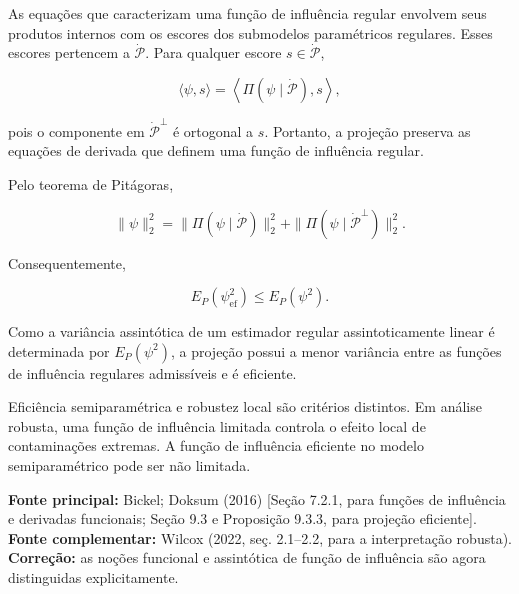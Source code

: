 \documentclass[
  letterpaper,
  DIV=11,
  numbers=noendperiod]{scrreprt}
\begin{document}
As equações que caracterizam uma função de influência regular envolvem
seus produtos internos com os escores dos submodelos paramétricos
regulares. Esses escores pertencem a \(\dot{\mathcal P}\). Para qualquer
escore \(s\in\dot{\mathcal P}\),

\[
\langle\psi,s\rangle
=
\left\langle
\Pi(\psi\mid\dot{\mathcal P}),s
\right\rangle,
\]

pois o componente em \(\dot{\mathcal P}^{\perp}\) é ortogonal a \(s\).
Portanto, a projeção preserva as equações de derivada que definem uma
função de influência regular.

Pelo teorema de Pitágoras,

\[
\|\psi\|_2^2
=
\|\Pi(\psi\mid\dot{\mathcal P})\|_2^2
+
\|\Pi(\psi\mid\dot{\mathcal P}^{\perp})\|_2^2.
\]

Consequentemente,

\[
E_P(\psi_{\mathrm{ef}}^2)
\leq
E_P(\psi^2).
\]

Como a variância assintótica de um estimador regular assintoticamente
linear é determinada por \(E_P(\psi^2)\), a projeção possui a menor
variância entre as funções de influência regulares admissíveis e é
eficiente.

\begin{tcolorbox}[enhanced jigsaw, colback=white, leftrule=.75mm, colbacktitle=quarto-callout-note-color!10!white, breakable, titlerule=0mm, bottomtitle=1mm, title=\textcolor{quarto-callout-note-color}{\faInfo}\hspace{0.5em}{Robustez}, colframe=quarto-callout-note-color-frame, toprule=.15mm, opacityback=0, bottomrule=.15mm, opacitybacktitle=0.6, arc=.35mm, toptitle=1mm, rightrule=.15mm, coltitle=black, left=2mm]

Eficiência semiparamétrica e robustez local são critérios distintos. Em
análise robusta, uma função de influência limitada controla o efeito
local de contaminações extremas. A função de influência eficiente no
modelo semiparamétrico pode ser não limitada.

\end{tcolorbox}

\begin{tcolorbox}[enhanced jigsaw, colback=white, leftrule=.75mm, colbacktitle=quarto-callout-note-color!10!white, breakable, titlerule=0mm, bottomtitle=1mm, title=\textcolor{quarto-callout-note-color}{\faInfo}\hspace{0.5em}{Fonte da demonstração}, colframe=quarto-callout-note-color-frame, toprule=.15mm, opacityback=0, bottomrule=.15mm, opacitybacktitle=0.6, arc=.35mm, toptitle=1mm, rightrule=.15mm, coltitle=black, left=2mm]

\textbf{Fonte principal:} Bickel; Doksum (2016) {[}Seção 7.2.1, para
funções de influência e derivadas funcionais; Seção 9.3 e Proposição
9.3.3, para projeção eficiente{]}.\\
\textbf{Fonte complementar:} Wilcox (2022, seç. 2.1--2.2, para a
interpretação robusta).\\
\textbf{Correção:} as noções funcional e assintótica de função de
influência são agora distinguidas explicitamente.

\end{tcolorbox}
\end{document}
